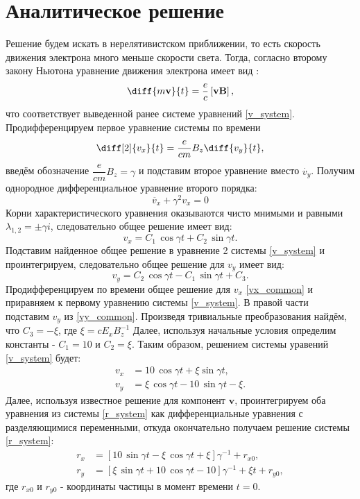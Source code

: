 \documentclass[a4paper]{article}
\begin{document}
\section{Аналитическое решение}
Решение будем искать в нерелятивистском приближении, то есть скорость движения электрона много меньше скорости света. Тогда, согласно второму закону Ньютона уравнение движения электрона имеет вид \cite{Izmaylov} :
\begin{equation}
\diff{m \mathbf{v}}{t} = \dfrac{e}{c} \left[ \mathbf{vB} \right] ,
\end{equation}
что соответствует выведенной ранее системе уравнений \eqref{v_system}. Продифференцируем первое уравнение системы по времени
\[
\diff[2]{v_x}{t} =\frac{e}{cm} B_z \diff{v_y}{t},
\]
введём обозначение $\dfrac{e}{cm}B_z = \gamma$ и подставим второе уравнение вместо $\dot{v_y}$. Получим однородное дифференциальное уравнение второго порядка:
\[
\ddot{v_x} + \gamma^2 v_x = 0		
\]
Корни характеристического уравнения оказываются чисто мнимыми и равными ${\lambda_{1,2} = \pm \gamma i}$, следовательно общее решение имеет вид:
\begin{equation}\label{vx_common}
v_x = C_1\, \cos{\gamma t} + C_2\, \sin{\gamma t} .
\end{equation}
Подставим найденное общее решение в уравнение 2 системы \eqref{v_system} и проинтегрируем, следовательно общее решение для $v_y$ имеет вид:
\begin{equation}\label{vy_common}
v_y = C_2 \, \cos{\gamma t} - C_1 \, \sin {\gamma t} + C_3 .
\end{equation}
Продифференцируем по времени общее решение для $v_x$ \eqref{vx_common} и приравняем к первому уравнению системы \eqref{v_system}. В правой части подставим $v_y$ из \eqref{vy_common}. Произведя тривиальные преобразования найдём, что $C_3 = -\xi$, где $\xi = cE_xB_z^{-1}$ Далее, используя начальные условия определим константы - $C_1 = 10$ и $C_2 = \xi$. Таким образом, решением системы уравений \eqref{v_system} будет:
\begin{align}\label{analytic_v}
v_x &= 10 \, \cos{\gamma t} + \xi \sin{\gamma t} , \\
v_y &= \xi \, \cos{\gamma t} - 10 \, \sin {\gamma t} - \xi .
\end{align}
Далее, используя известное решение для компонент $\mathbf{v}$, проинтегрируем оба уравнения из системы \eqref{r_system} как дифференциальные уравнения с разделяющимися переменными, откуда окончательно получаем решение системы \eqref{r_system}:
\begin{align}\label{analytic_r}
r_x &= \left[10 \, \sin{\gamma t} - \xi \, \cos{\gamma t} + \xi\right] \gamma^{-1} + r_{x0} ,\\
r_y &= \left[\xi \, \sin{\gamma t} + 10 \, \cos{\gamma t} - 10\right] \gamma^{-1} + \xi t  + r_{y0} , 
\end{align} 
где $r_{x0}$ и $r_{y0}$ - координаты частицы в момент времени $t=0$.
\end{document}
